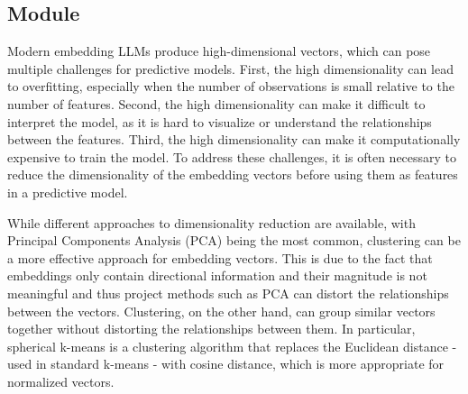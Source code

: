 \documentclass[article]{jss}
\begin{document}
\subsection[cluster Module]{ Module}\label{subsec:module-cluster}

Modern embedding LLMs produce high-dimensional vectors, which can pose multiple challenges for predictive models. First, the high dimensionality can lead to overfitting, especially when the number of observations is small relative to the number of features. Second, the high dimensionality can make it difficult to interpret the model, as it is hard to visualize or understand the relationships between the features. Third, the high dimensionality can make it computationally expensive to train the model. To address these challenges, it is often necessary to reduce the dimensionality of the embedding vectors before using them as features in a predictive model.

While different approaches to dimensionality reduction are available, with Principal Components Analysis (PCA) being the most common, clustering can be a more effective approach for embedding vectors. This is due to the fact that embeddings only contain directional information and their magnitude is not meaningful and thus project methods such as PCA can distort the relationships between the vectors. Clustering, on the other hand, can group similar vectors together without distorting the relationships between them. In particular, spherical k-means is a clustering algorithm that replaces the Euclidean distance - used in standard k-means - with cosine distance, which is more appropriate for normalized vectors.
\end{document}
